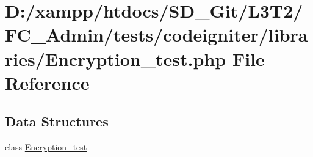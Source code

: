 \hypertarget{_admin_2tests_2codeigniter_2libraries_2_encryption__test_8php}{}\section{D\+:/xampp/htdocs/\+S\+D\+\_\+\+Git/\+L3\+T2/\+F\+C\+\_\+\+Admin/tests/codeigniter/libraries/\+Encryption\+\_\+test.php File Reference}
\label{_admin_2tests_2codeigniter_2libraries_2_encryption__test_8php}
\subsection*{Data Structures}
\begin{DoxyCompactItemize}
\item 
class \hyperlink{class_encryption__test}{Encryption\+\_\+test}
\end{DoxyCompactItemize}
